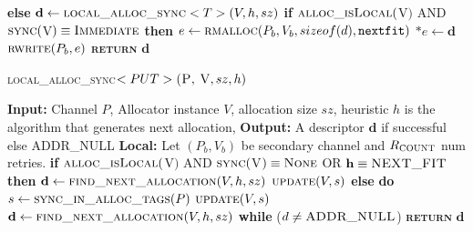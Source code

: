 \documentclass[10pt]{article}
\begin{document}
\begin{algorithm}{}
\begin{algorithmic}[1]
\STATE \textbf{else}
\STATE \quad $\textbf{d} \gets \textsc{local\_alloc\_sync}<T>(V, h, sz)$ 
\STATE \quad \textbf{if} $\textsc{alloc\_isLocal}($V$)$ AND $\textsc{sync}($V$) \equiv \textsc{Immediate}$ \textbf{then}
\STATE \qquad $e \gets \textsc{rmalloc}(P_{b}, V_{b}, sizeof(d), \texttt{nextfit})$
\STATE \qquad $*e \gets \textbf{d}$
\STATE \qquad $\textsc{rwrite}(P_{b}, e)$ 
\STATE \textsc{\textbf{return}} {$\textbf{d}$}

\end{algorithmic}
\end{algorithm}


\begin{algorithm}{}
\footnotesize
\caption{\textsc{local\_alloc\_sync}{$<PUT>\textsc{(P, V}, sz, h)$}}
\label{alg:lalloc} 
\begin{algorithmic}[1]


\STATE \textbf{Input:} Channel $P$, Allocator instance $V$, allocation size $sz$, heuristic $h$
is the algorithm that generates next allocation, 
\STATE \textbf{Output:} A descriptor {$\textbf{d}$} if successful else \textsc{ADDR\_NULL}
\STATE \textbf{Local:} Let $(P_{b}, V_{b})$ be secondary channel and $R_{\textsc{COUNT}}$ num retries.
\STATE \textbf{if} $\textsc{alloc\_isLocal}($V$)$ AND $\textsc{sync}($V$) \equiv \textsc{None}$ OR $\textbf{h} \equiv \textsc{NEXT\_FIT}$  \textbf{then} 
\STATE \quad $\textbf{d} \leftarrow  \textsc{find\_next\_allocation}(V, h, sz)$ 
\STATE \quad $\textsc{update}(V, s)$
\STATE \textbf{else}
\STATE \quad \textbf{do}
\STATE \qquad $s \gets \textsc{sync\_in\_alloc\_tags}(P)$
\STATE \qquad $\textsc{update}(V, s)$
\STATE \qquad $\textbf{d} \leftarrow  \textsc{find\_next\_allocation}(V, h, sz)$
\STATE \quad \textbf{while} ($d \neq \textsc{ADDR\_NULL}$)
\STATE \textsc{\textbf{return}} {$\textbf{d}$}
\STATE


\end{algorithmic}
\end{algorithm}
\end{document}
